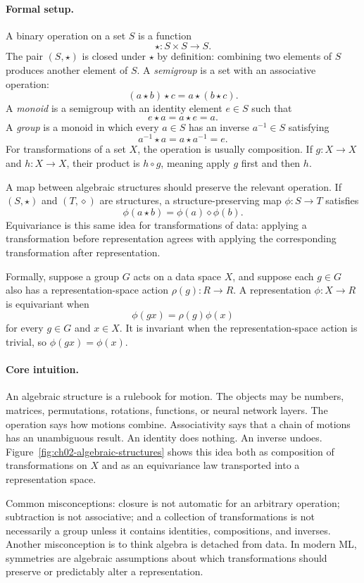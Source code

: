 \paragraph{Formal setup.}
A binary operation on a set \(S\) is a function
\[
\star:S\times S\to S.
\]
The pair \((S,\star)\) is closed under \(\star\) by definition: combining two elements of \(S\) produces another element of \(S\). A \emph{semigroup} is a set with an associative operation:
\[
(a\star b)\star c=a\star(b\star c).
\]
A \emph{monoid} is a semigroup with an identity element \(e\in S\) such that
\[
e\star a=a\star e=a.
\]
A \emph{group} is a monoid in which every \(a\in S\) has an inverse \(a^{-1}\in S\) satisfying
\[
a^{-1}\star a=a\star a^{-1}=e.
\]
For transformations of a set \(X\), the operation is usually composition. If \(g:X\to X\) and \(h:X\to X\), their product is \(h\circ g\), meaning apply \(g\) first and then \(h\).

A map between algebraic structures should preserve the relevant operation. If \((S,\star)\) and \((T,\diamond)\) are structures, a structure-preserving map \(\phi:S\to T\) satisfies
\[
\phi(a\star b)=\phi(a)\diamond \phi(b).
\]
Equivariance is this same idea for transformations of data: applying a transformation before representation agrees with applying the corresponding transformation after representation.

Formally, suppose a group \(G\) acts on a data space \(X\), and suppose each \(g\in G\) also has a representation-space action \(\rho(g):R\to R\). A representation \(\phi:X\to R\) is equivariant when
\[
\phi(gx)=\rho(g)\phi(x)
\]
for every \(g\in G\) and \(x\in X\). It is invariant when the representation-space action is trivial, so \(\phi(gx)=\phi(x)\).

\paragraph{Core intuition.}
An algebraic structure is a rulebook for motion. The objects may be numbers, matrices, permutations, rotations, functions, or neural network layers. The operation says how motions combine. Associativity says that a chain of motions has an unambiguous result. An identity does nothing. An inverse undoes. Figure~\ref{fig:ch02-algebraic-structures} shows this idea both as composition of transformations on \(X\) and as an equivariance law transported into a representation space.

Common misconceptions: closure is not automatic for an arbitrary operation; subtraction is not associative; and a collection of transformations is not necessarily a group unless it contains identities, compositions, and inverses. Another misconception is to think algebra is detached from data. In modern ML, symmetries are algebraic assumptions about which transformations should preserve or predictably alter a representation.

